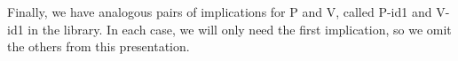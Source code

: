 \begin{AgdaAlign}
\begin{code}%
\>[0]\<%
\\
\>[0][@{}l@{\AgdaIndent{1}}]%
\>[1]\AgdaSpace{}%
\AgdaSymbol{:}\AgdaSpace{}%
\AgdaSpace{}%
\AgdaSpace{}%
\AgdaSpace{}%
\AgdaSpace{}%
\AgdaSpace{}%
\AgdaSpace{}%
\AgdaSymbol{\{}\AgdaSpace{}%
\AgdaSymbol{=}\AgdaSpace{}%
\AgdaSymbol{\}\{}\AgdaSymbol{\}}\AgdaSpace{}%
\AgdaSpace{}%
\AgdaSpace{}%
\AgdaSpace{}%
\AgdaSpace{}%
\<%
\\
%
\>[1]\AgdaSpace{}%
\AgdaSpace{}%
\AgdaSpace{}%
\AgdaSymbol{(}\AgdaSpace{}%
\AgdaOperator{\AgdaInductiveConstructor{,}}\AgdaSpace{}%
\AgdaSpace{}%
\AgdaOperator{\AgdaInductiveConstructor{,}}\AgdaSpace{}%
\AgdaSymbol{)}\AgdaSpace{}%
\AgdaSymbol{=}\AgdaSpace{}%
\AgdaSymbol{\{}\AgdaSpace{}%
\AgdaSymbol{=}\AgdaSpace{}%
\AgdaSymbol{\}\{}\AgdaSymbol{\}}\AgdaSpace{}%
\AgdaSymbol{(}\AgdaSpace{}%
\AgdaSpace{}%
\AgdaSymbol{)}\AgdaSpace{}%
\<%
\\
%
\>[1]\AgdaSpace{}%
\AgdaSymbol{:}\AgdaSpace{}%
\AgdaSpace{}%
\AgdaSpace{}%
\AgdaSpace{}%
\AgdaSpace{}%
\AgdaSpace{}%
\AgdaSpace{}%
\AgdaSpace{}%
\AgdaSpace{}%
\AgdaSpace{}%
\AgdaSpace{}%
\AgdaSpace{}%
\AgdaSpace{}%
\<%
\\
%
\>[1]\AgdaSpace{}%
\AgdaSpace{}%
\AgdaSpace{}%
\AgdaSpace{}%
\AgdaSymbol{=}\AgdaSpace{}%
\AgdaSpace{}%
\AgdaSpace{}%
\AgdaSymbol{(}\AgdaSpace{}%
\AgdaOperator{\AgdaInductiveConstructor{,}}\AgdaSpace{}%
\AgdaSymbol{(}\AgdaSpace{}%
\AgdaOperator{\AgdaInductiveConstructor{,}}\AgdaSpace{}%
\AgdaSymbol{))}\<%
\\
\>[0]\<%
\end{code}
Finally, we have analogous pairs of implications for \af P and \af V,
\ifshort
called P-id1 and V-id1 in the \agdaalgebras library.
\else
In each case, we will only need the first implication, so we omit the others from this presentation.


\end{AgdaAlign}
